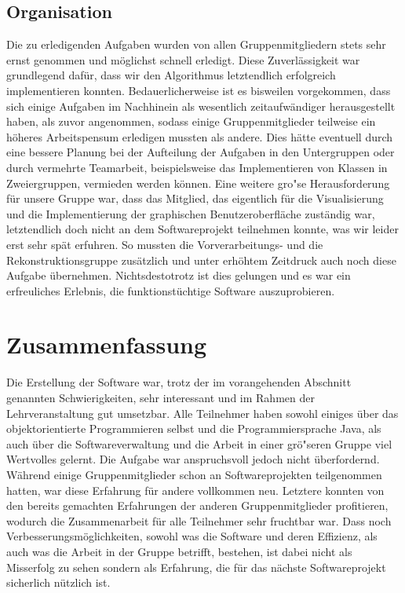 \documentclass[parskip=half,
 fontsize=12pt, bibtotoc,
 ngerman]
 {article}
\begin{document}
\subsection*{Organisation}
Die zu erledigenden Aufgaben wurden von allen Gruppenmitgliedern stets sehr ernst genommen und möglichst schnell erledigt. Diese Zuverlässigkeit war grundlegend dafür, dass wir den Algorithmus letztendlich erfolgreich implementieren konnten. Bedauerlicherweise ist es bisweilen vorgekommen, dass sich einige Aufgaben im Nachhinein als wesentlich zeitaufwändiger herausgestellt haben, als zuvor angenommen, sodass einige Gruppenmitglieder teilweise ein höheres Arbeitspensum erledigen mussten als andere. Dies hätte eventuell durch eine bessere Planung bei der Aufteilung der Aufgaben in den Untergruppen oder durch vermehrte Teamarbeit, beispielsweise das Implementieren von Klassen in Zweiergruppen, vermieden werden können.\newline
Eine weitere gro"se Herausforderung für unsere Gruppe war, dass das Mitglied, das eigentlich für die Visualisierung und die Implementierung der graphischen Benutzeroberfläche zuständig war, letztendlich doch nicht an dem Softwareprojekt teilnehmen konnte, was wir leider erst sehr spät erfuhren. So mussten die Vorverarbeitungs- und die Rekonstruktionsgruppe zusätzlich und unter erhöhtem Zeitdruck auch noch diese Aufgabe übernehmen. Nichtsdestotrotz ist dies gelungen und es war ein erfreuliches Erlebnis, die funktionstüchtige Software auszuprobieren.

\section{Zusammenfassung}
Die Erstellung der Software war, trotz der im vorangehenden Abschnitt genannten Schwierigkeiten, sehr interessant und im Rahmen der Lehrveranstaltung gut umsetzbar. Alle Teilnehmer haben sowohl einiges über das objektorientierte Programmieren selbst und die Programmiersprache Java, als auch über die Softwareverwaltung und die Arbeit in einer grö"seren Gruppe viel Wertvolles gelernt. Die Aufgabe war anspruchsvoll jedoch nicht überfordernd. Während einige Gruppenmitglieder schon an Softwareprojekten teilgenommen hatten, war diese Erfahrung für andere vollkommen neu. Letztere konnten von den bereits gemachten Erfahrungen der anderen Gruppenmitglieder profitieren, wodurch die Zusammenarbeit für alle Teilnehmer sehr fruchtbar war. Dass noch Verbesserungsmöglichkeiten, sowohl was die Software und deren Effizienz, als auch was die Arbeit in der Gruppe betrifft, bestehen, ist dabei nicht als Misserfolg zu sehen sondern als Erfahrung, die für das nächste Softwareprojekt sicherlich nützlich ist. 
\printbibliography
\end{document}
